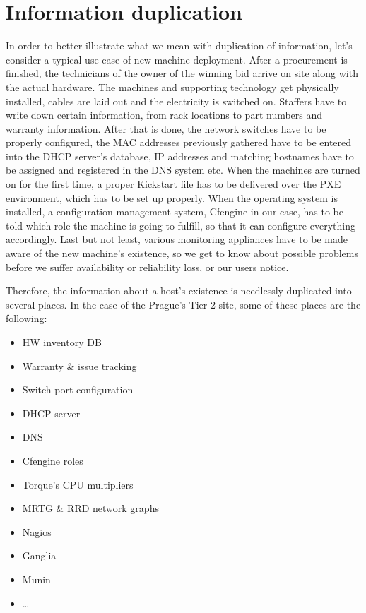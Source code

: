 \documentclass[11pt]{article}
\begin{document}
\section{Information duplication}

In order to better illustrate what we mean with duplication of information,
let's consider a typical use case of new machine deployment.  After a
procurement is finished, the technicians of the owner of the winning bid arrive
on site along with the actual hardware.  The machines and supporting technology
get physically installed, cables are laid out and the electricity is switched
on.  Staffers have to write down certain information, from rack locations to
part numbers and warranty information.  After that is done, the network switches
have to be properly configured, the MAC addresses previously gathered have to be
entered into the DHCP server's database, IP addresses and matching hostnames
have to be assigned and registered in the DNS system etc.  When the machines are
turned on for the first time, a proper Kickstart file has to be delivered over
the PXE environment, which has to be set up properly.  When the operating system
is installed, a configuration management system, Cfengine in our case, has to be
told which role the machine is going to fulfill, so that it can configure
everything accordingly.  Last but not least, various monitoring appliances have
to be made aware of the new machine's existence, so we get to know about
possible problems before we suffer availability or reliability loss, or our
users notice.

Therefore, the information about a host's existence is needlessly duplicated
into several places.  In the case of the Prague's Tier-2 site, some of these
places are the following:

\begin{itemize}
    \item HW inventory DB
    \item Warranty \& issue tracking
    \item Switch port configuration
    \item DHCP server
    \item DNS
    \item Cfengine roles
    \item Torque's CPU multipliers
    \item MRTG \& RRD network graphs
    \item Nagios
    \item Ganglia
    \item Munin
    \item \ldots
\end{itemize}
\end{document}
